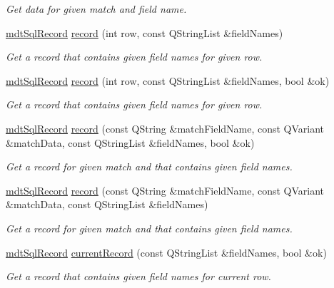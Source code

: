 \begin{DoxyCompactItemize}
\begin{DoxyCompactList}\small\item\em Get data for given match and field name. \end{DoxyCompactList}\item 
\hyperlink{classmdt_sql_record}{mdt\-Sql\-Record} \hyperlink{classmdt_abstract_sql_table_controller_a1bf49f87908a1468bea5b9f3fc833a7c}{record} (int row, const Q\-String\-List \&field\-Names)
\begin{DoxyCompactList}\small\item\em Get a record that contains given field names for given row. \end{DoxyCompactList}\item 
\hyperlink{classmdt_sql_record}{mdt\-Sql\-Record} \hyperlink{classmdt_abstract_sql_table_controller_ae1f088f168d52b6253628a9a337a3adf}{record} (int row, const Q\-String\-List \&field\-Names, bool \&ok)
\begin{DoxyCompactList}\small\item\em Get a record that contains given field names for given row. \end{DoxyCompactList}\item 
\hyperlink{classmdt_sql_record}{mdt\-Sql\-Record} \hyperlink{classmdt_abstract_sql_table_controller_a9b83c25b5b8027bef36ab314be0b2a1c}{record} (const Q\-String \&match\-Field\-Name, const Q\-Variant \&match\-Data, const Q\-String\-List \&field\-Names, bool \&ok)
\begin{DoxyCompactList}\small\item\em Get a record for given match and that contains given field names. \end{DoxyCompactList}\item 
\hyperlink{classmdt_sql_record}{mdt\-Sql\-Record} \hyperlink{classmdt_abstract_sql_table_controller_a074c3b2a60e38acff2f754c6f2b787d8}{record} (const Q\-String \&match\-Field\-Name, const Q\-Variant \&match\-Data, const Q\-String\-List \&field\-Names)
\begin{DoxyCompactList}\small\item\em Get a record for given match and that contains given field names. \end{DoxyCompactList}\item 
\hyperlink{classmdt_sql_record}{mdt\-Sql\-Record} \hyperlink{classmdt_abstract_sql_table_controller_a68a9b5aa1baa7ed556c14111b07dd57a}{current\-Record} (const Q\-String\-List \&field\-Names, bool \&ok)
\begin{DoxyCompactList}\small\item\em Get a record that contains given field names for current row. \end{DoxyCompactList}\item 

\end{DoxyCompactItemize}
